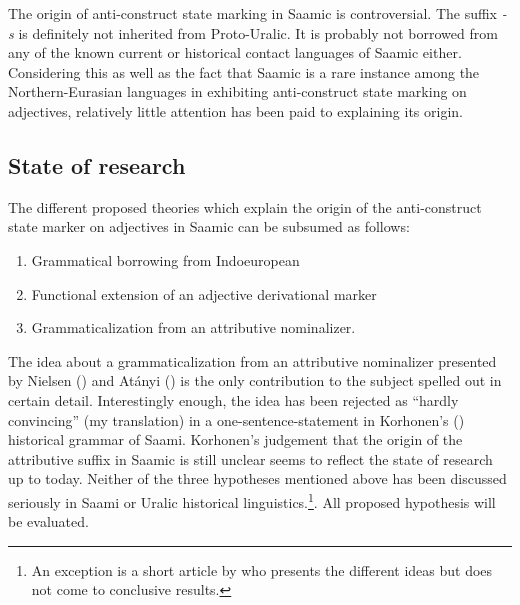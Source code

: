 {The origin of anti-construct state marking in Saamic is controversial. The suffix \textit{-s} is definitely not inherited from Proto-Uralic. It is probably not borrowed from any of the known current or historical contact languages of Saamic either. Considering this as well as the fact that Saamic is a rare instance among the Northern-Eurasian languages in exhibiting anti-construct state marking on adjectives, relatively little attention has been paid to explaining its origin.

\subsection{State of research}
The different proposed theories which explain the origin of the anti-construct state marker on adjectives in Saamic can be subsumed as follows:
\begin{enumerate}
\item Grammatical borrowing from Indoeuropean
\item Functional extension of an adjective derivational marker
\item Grammaticalization from an attributive nominalizer.
\end{enumerate}
The idea about a grammaticalization from an attributive nominalizer presented by Nielsen (\citeyear{nielsen1933}) and Atányi (\citeyear{atanyi1942,atanyi1943}) is the only contribution to the subject spelled out in certain detail. Interestingly enough, the idea has been rejected as “hardly convincing” (my translation) in a one-sentence-statement in Korhonen's (\citeyear{korhonen-m1981}) historical grammar of Saami. Korhonen's judgement that the origin of the attributive suffix in Saamic is still unclear \cite[246]{korhonen-m1981} seems to reflect the state of research up to today. Neither of the three hypotheses mentioned above has been discussed seriously in Saami or Uralic historical linguistics.\footnote{An exception is a short article by \cite{sarv-m2001} who presents the different ideas but does not come to conclusive results.}. All proposed hypothesis will be evaluated.

}
